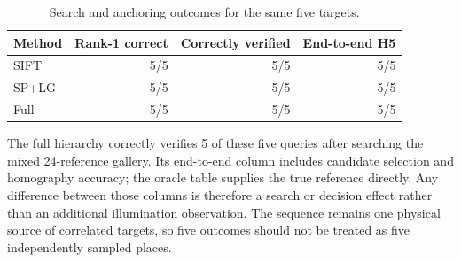 \begin{table}[H]\centering\small
\caption{Search and anchoring outcomes for the same five targets.}\label{tab:hp-end-23}
\begin{tabular}{lrrr}\toprule
Method & Rank-1 correct & Correctly verified & End-to-end H5 \\
\midrule
SIFT & 5/5 & 5/5 & 5/5 \\
SP+LG & 5/5 & 5/5 & 5/5 \\
Full & 5/5 & 5/5 & 5/5 \\
\bottomrule\end{tabular}\end{table}


The full hierarchy correctly verifies 5 of these five queries after searching the mixed 24-reference gallery. Its end-to-end column includes candidate selection and homography accuracy; the oracle table supplies the true reference directly. Any difference between those columns is therefore a search or decision effect rather than an additional illumination observation. The sequence remains one physical source of correlated targets, so five outcomes should not be treated as five independently sampled places.
